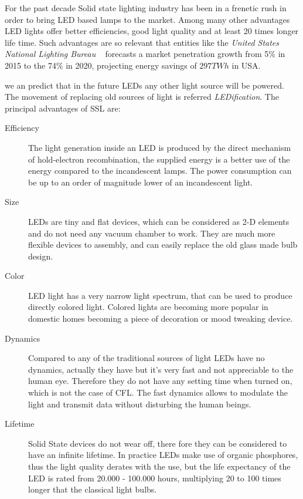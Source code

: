 For the past decade Solid state lighting industry has been in a frenetic rush in order to bring LED based lamps to the market. Among many other advantages LED lights offer better efficiencies, good light quality and at least 20 times longer life time. Such advantages are so relevant that entities like the \emph{United States National Lighting Bureau} ~\cite{14USDoE} forecasts a market penetration growth from 5\% in 2015 to the 74\% in 2020, projecting energy savings of $297TWh$ in USA.
 
 
 
 we an predict that in the future LEDs any other light source will be  powered. The movement of replacing old sources of light is referred \emph{LEDification}. The principal advantages of SSL are:
\begin{description}
  \item [Efficiency] The light generation inside an LED is produced by the direct mechanism of hold-electron recombination, the supplied energy is a better use of the energy compared to the incandescent lamps. The power consumption can be up to an order of magnitude lower of an incandescent light.

  \item [Size] LEDs are tiny and flat devices, which can be considered as 2-D elements and do not need any vacuum chamber to work. They are much more flexible devices to assembly, and can easily replace the old glass made bulb design.

  \item [Color] LED light has a very narrow light spectrum, that can be used to produce directly colored light. Colored lights are becoming more popular in domestic homes becoming a piece of decoration or mood tweaking device.

  \item [Dynamics] Compared to any of the traditional sources of light LEDs have no dynamics, actually they have but it's very fast and not appreciable to the human eye. Therefore they do not have any setting time when turned on, which is not the case of CFL. The fast dynamics allows to modulate the light and transmit data without disturbing the human beings.

  \item [Lifetime] Solid State devices do not wear off, there fore they can be considered to have an infinite lifetime. In practice LEDs make use of organic phosphores, thus the light quality derates with the use, but the life expectancy of the LED is rated from 20.000 - 100.000 hours, multiplying 20 to 100 times longer that the classical light bulbs.
\end{description}

